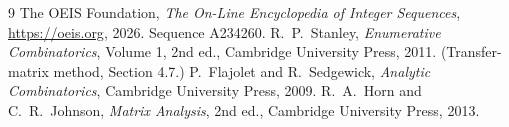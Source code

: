 \documentclass[11pt,a4paper]{article}
\theoremstyle{plain}
\theoremstyle{definition}
\begin{document}
\begin{thebibliography}{9}
 The OEIS Foundation, \emph{The On-Line Encyclopedia of Integer
Sequences}, \url{https://oeis.org}, 2026. Sequence A234260.
 R.~P.~Stanley, \emph{Enumerative Combinatorics}, Volume 1, 2nd ed.,
Cambridge University Press, 2011. (Transfer-matrix method, Section 4.7.)
 P.~Flajolet and R.~Sedgewick, \emph{Analytic Combinatorics}, Cambridge
University Press, 2009.
 R.~A.~Horn and C.~R.~Johnson, \emph{Matrix Analysis}, 2nd ed., Cambridge
University Press, 2013.
\end{thebibliography}
\end{document}
